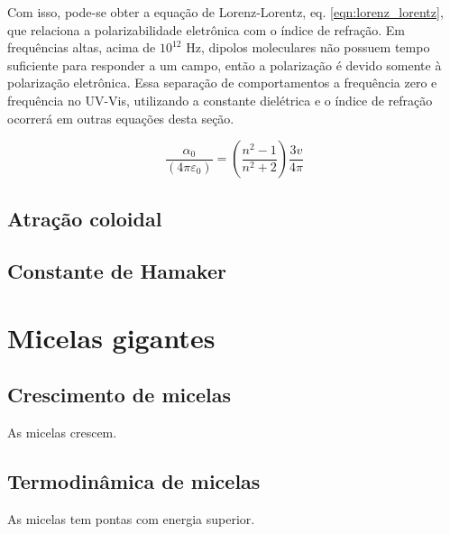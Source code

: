 	Com isso, pode-se obter a equação de Lorenz-Lorentz, eq. \ref{eqn:lorenz_lorentz}, que relaciona a polarizabilidade eletrônica com o índice de refração. Em frequências altas, acima de \(10^{12}\) Hz, dipolos moleculares não possuem tempo suficiente para responder a um campo, então a polarização é devido somente à polarização eletrônica. Essa separação de comportamentos a frequência zero e frequência no UV-Vis, utilizando a constante dielétrica e o índice de refração ocorrerá em outras equações desta seção.
	
	\begin{equation}
		\dfrac { \alpha _ { 0 } } { \left( 4 \pi \varepsilon _ { 0 } \right) } = \left( \dfrac { n ^ { 2 } - 1 } { n ^ { 2 } + 2 } \right) \dfrac { 3 v } { 4 \pi }
		\label{eqn:lorenz_lorentz}
	\end{equation}
	
	
		\section{Atração coloidal}
		\section{Constante de Hamaker}
	\chapter{Micelas gigantes}
		\label{chap:micelas_gigantes}
		\section{Crescimento de micelas}
		As micelas crescem.
		\section{Termodinâmica de micelas}
		As micelas tem pontas com energia superior.
